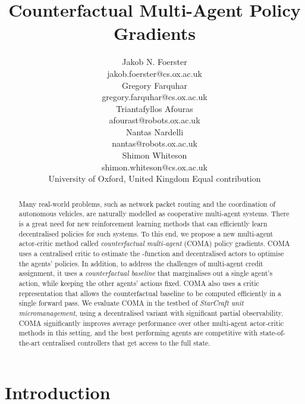 \documentclass[letterpaper]{article}
\begin{document}
 
	
	\title{Counterfactual Multi-Agent Policy Gradients}
	\author{
		Jakob N. Foerster\\
		jakob.foerster@cs.ox.ac.uk\\
		\And
		Gregory Farquhar \\
		gregory.farquhar@cs.ox.ac.uk \\
		\AND
		Triantafyllos Afouras\\
		afourast@robots.ox.ac.uk\\
		\And
		Nantas Nardelli\\
		nantas@robots.ox.ac.uk\\
		\And
		Shimon Whiteson\\
		shimon.whiteson@cs.ox.ac.uk\\
		\AND
		\textnormal{University of Oxford, United Kingdom \quad 
		Equal contribution}
	}
	
	\maketitle

\begin{abstract}
\label{sec:abstract}
Many real-world problems, such as network packet routing  and the coordination of autonomous vehicles, are naturally modelled as cooperative multi-agent systems.  There is a great need for new reinforcement learning methods that can efficiently learn
decentralised policies for such systems.  To this end, we propose a new multi-agent actor-critic method called \emph{counterfactual multi-agent} (COMA) policy
gradients.  COMA uses a centralised critic to estimate the -function and
decentralised actors to optimise the agents' policies.  In addition, to address
the challenges of multi-agent credit assignment, it uses a \emph{counterfactual
baseline} that marginalises out a single agent's action, while keeping the other
agents' actions fixed. COMA also uses a critic representation that allows the
counterfactual baseline to be computed efficiently in a single forward pass. We
evaluate COMA in the testbed of \emph{StarCraft unit micromanagement}, using a
decentralised variant with significant partial observability. COMA significantly
improves average performance over other multi-agent actor-critic methods in this
setting,
and the best performing agents are competitive with  state-of-the-art centralised
controllers that get access to the full state.\end{abstract}

\section{Introduction}
\label{sec:intro}
\end{document}
